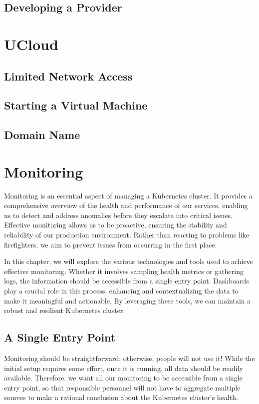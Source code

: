 \section{Developing a Provider}

\chapter{UCloud}

\section{Limited Network Access}

\section{Starting a Virtual Machine}

\section{Domain Name}

\chapter{Monitoring}
Monitoring is an essential aspect of managing a Kubernetes cluster. It provides a comprehensive overview of the health and performance of our services, enabling us to detect and address anomalies before they escalate into critical issues. Effective monitoring allows us to be proactive, ensuring the stability and reliability of our production environment. Rather than reacting to problems like firefighters, we aim to prevent issues from occurring in the first place.

In this chapter, we will explore the various technologies and tools used to achieve effective monitoring. Whether it involves sampling health metrics or gathering logs, the information should be accessible from a single entry point. Dashboards play a crucial role in this process, enhancing and contextualizing the data to make it meaningful and actionable. By leveraging these tools, we can maintain a robust and resilient Kubernetes cluster.

\section{A Single Entry Point}
Monitoring should be straightforward; otherwise, people will not use it! While the initial setup requires some effort, once it is running, all data should be readily available. Therefore, we want all our monitoring to be accessible from a single entry point, so that responsible personnel will not have to aggregate multiple sources to make a rational conclusion about the Kubernetes cluster’s health.


